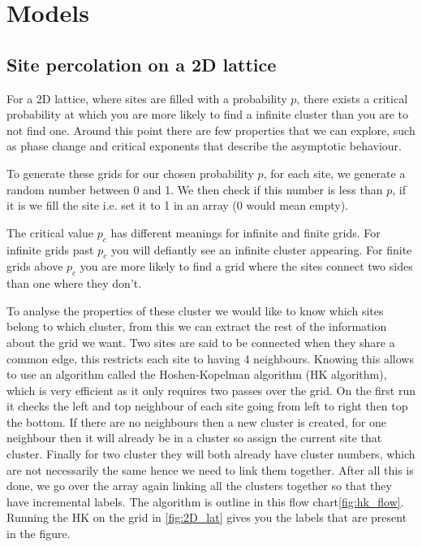 \documentclass[%
 reprint,
 amsmath,amssymb,
 aps,
]{revtex4-2}
\begin{document}
\section{Models}\label{sec:models}
\subsection{Site percolation on a 2D lattice}\label{sec:site}
For a 2D lattice, where sites are filled with a probability $p$, there exists a critical probability at which you are more likely to find a infinite cluster than you are to not find one. Around this point there are few properties that we can explore, such as phase change and critical exponents that describe the asymptotic behaviour.

To generate these grids for our chosen probability $p$, for each site, we generate a random number between 0 and 1. We then check if this number is less than $p$, if it is we fill the site i.e. set it to 1 in an array (0 would mean empty).

The critical value $p_{c}$ has different meanings for infinite and finite grids. For infinite grids past $p_{c}$ you will defiantly see an infinite cluster appearing. For finite grids above $p_{c}$ you are more likely to find a grid where the sites connect two sides than one where they don't.

To analyse the properties of these cluster we would like to know which sites belong to which cluster, from this we can extract the rest of the information about the grid we want. Two sites are said to be connected when they share a common edge, this restricts each site to having 4 neighbours. Knowing this allows to use an algorithm called the Hoshen-Kopelman algorithm \cite{hoshen_percolation_1976} (HK algorithm), which is very efficient as it only requires two passes over the grid. On the first run it checks the left and top neighbour of each site going from left to right then top the bottom. If there are no neighbours then a new cluster is created, for one neighbour then it will already be in a cluster so assign the current site that cluster. Finally for two cluster they will both already have cluster numbers, which are not necessarily the same hence we need to link them together. After all this is done, we go over the array again linking all the clusters together so that they have incremental labels. The algorithm is outline in this flow chart\cref{fig:hk_flow}. Running the HK on the grid in \cref{fig:2D_lat} gives you the labels that are present in the figure.
\end{document}
